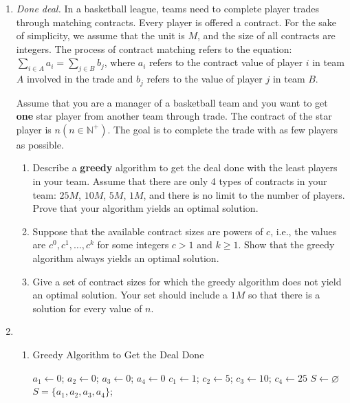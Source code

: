 \documentclass[12pt,a4paper]{article}
\makeatletter
\newtheorem*{solution}{Solution}
\theoremstyle{definition}
\renewenvironment{solution}[1][Solution] {\par\pushQED{\qed}\normalfont\topsep6\p@\@plus6\p@\relax\trivlist\item[\hskip\labelsep\bfseries#1\@addpunct{.}]\ignorespaces}{\popQED\endtrivlist\@endpefalse} \makeatother
\makeatother
\begin{document}
\begin{enumerate}
	\item \textit{Done deal.} In a basketball league, teams need to complete player trades through matching contracts. Every player is offered a contract. For the sake of simplicity, we assume that the unit is $ M $, and the size of all contracts are integers. The process of contract matching refers to the equation: $ \sum_{i\in A} a_{i}=\sum_{j\in B} b_{j} $, where $ a_{i} $ refers to the contract value of player $ i $ in team $A$ involved in the trade and $ b_{j} $ refers to the value of player $ j $ in team $B$. 
	
	Assume that you are a manager of a basketball team and you want to get \textbf{one} star player from another team through trade. The contract of the star player is $ n (n\in \mathbb{N}^+) $. The goal is to complete the trade with as few players as possible. 
	
	\begin{enumerate}
		\item Describe a \textbf{greedy} algorithm to get the deal done with the least players in your team. Assume that there are only 4 types of contracts in your team: $25M$, $ 10M $, $ 5M $, $ 1M $, and there is no limit to the number of players. Prove that your algorithm yields an optimal solution.
		\item Suppose that the available contract sizes are powers of $c$,
		i.e., the values are $c^{0}, c^{1}, \ldots, c^{k}$ for some integers $c>1$ and $k \geq 1$. Show that the greedy algorithm always yields an optimal solution.
		\item Give a set of contract sizes for which the greedy algorithm does not yield an optimal solution. Your set should include a $ 1M $ so that there is a solution for every value of $ n $.
	\end{enumerate}
    \begin{solution}
        ~
        \begin{enumerate}
            \item \begin{minipage}[t]{0.8\textwidth}
        	    \begin{algorithm}[H]
        		
        		\BlankLine
        		\caption{Greedy Algorithm to Get the Deal Done}\label{greedy-deal}
        		$a_1\leftarrow 0$; $a_2\leftarrow 0$; $a_3\leftarrow 0$; $a_4\leftarrow 0$\;
        	    $c_1\leftarrow 1$; $c_2\leftarrow 5$; $c_3\leftarrow 10$; $c_4\leftarrow 25$\;
        	    $S\leftarrow \varnothing$\;
        		\Return $S=\{a_1,a_2,a_3,a_4\}$;
        	    \end{algorithm}
                \end{minipage}
                

\end{enumerate}
\end{solution}
\end{enumerate}
\end{document}
